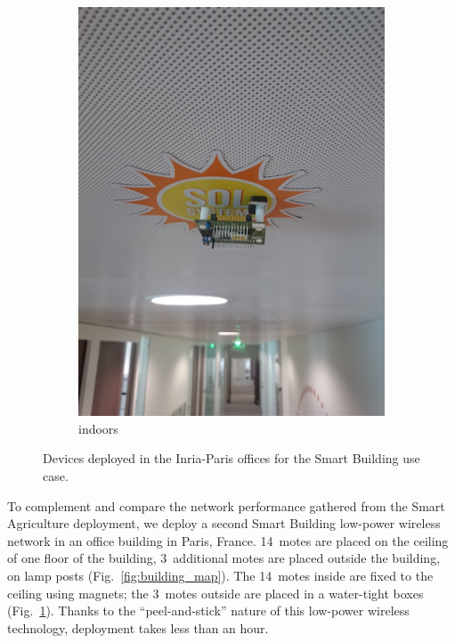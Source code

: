 \documentclass{elsarticle}
\newcommand{\building}            {Smart Building\xspace}
\newcommand{\agri}                {Smart Agriculture\xspace}
\begin{document}
\begin{figure}
\begin{subfigure}[h]{0.49\textwidth}
        \includegraphics[width=\textwidth]{smartbuilding_indoor}
        \caption{indoors}
    \end{subfigure} 
    \caption{Devices deployed in the Inria-Paris offices for the \building use case.}
    \label{fig:building_pics}
\end{figure}


To complement and compare the network performance gathered from the \agri deployment, we deploy a second \building low-power wireless network in an office building in Paris, France.
14~motes are placed on the ceiling of one floor of the building, 3~additional motes are placed outside the building, on lamp posts (Fig.~\ref{fig:building_map}).
The 14~motes inside are fixed to the ceiling using magnets; the 3~motes outside are placed in a water-tight boxes (Fig.~\ref{fig:building_pics}).
Thanks to the ``peel-and-stick'' nature of this low-power wireless technology, deployment takes less than an hour.
\end{document}
